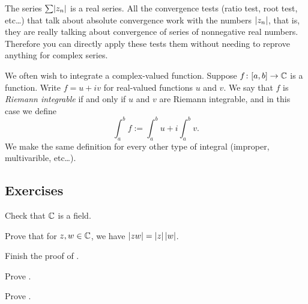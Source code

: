 The series $\sum \lvert {z_n} \rvert$ is a real series.  All the
convergence tests (ratio test, root test, etc\ldots) that talk about
absolute convergence work with the numbers $\lvert {z_n} \rvert$, that is, they
are really talking about convergence of series of nonnegative real
numbers.
Therefore you
can directly apply these tests
them without needing to reprove anything for complex
series.

\medskip

We often wish to integrate a complex-valued function.
Suppose $f \colon [a,b] \to {\mathbb{C}}$ is a function.
Write $f = u+iv$ for real-valued functions $u$ and $v$.
We say that $f$ is \emph{Riemann integrable}
if and only if $u$ and $v$ are Riemann
integrable, and in this case we define
\begin{equation*}
\int_a^b f := \int_a^b u + i \int_a^b v .
\end{equation*}
We make the same definition for every other type of integral (improper,
multivarible, etc\ldots).

\subsection{Exercises}

\begin{exercise}
Check that ${\mathbb{C}}$ is a field.
\end{exercise}

\begin{exercise}
Prove that for $z,w \in {\mathbb{C}}$, we have
$\lvert {zw} \rvert = \lvert {z} \rvert \, \lvert {w} \rvert$.
\end{exercise}

\begin{exercise}
Finish the proof of .
\end{exercise}

\begin{exercise}
Prove .
\end{exercise}

\begin{exercise}
Prove .
\end{exercise}

